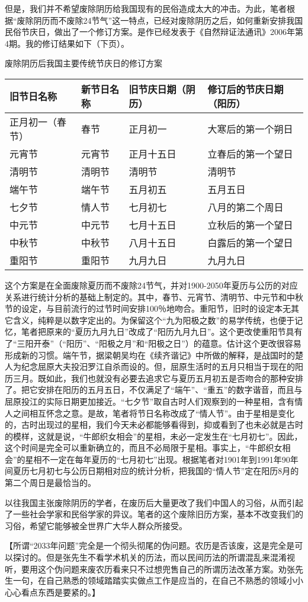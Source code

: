 但是，我们并不希望废除阴历给我国现有的民俗造成太大的冲击。为此，笔者根据“废除阴历而不废除24节气”这一特点，已经对废除阴历之后，如何重新安排我国民俗节庆日，做出了一个修订方案。是作已经发表于《自然辩证法通讯》2006年第4期。我的修订结果如下（下页）。
\begin{table}
\fangsong
\centerline{废除阴历后我国主要传统节庆日的修订方案}
\vspace{0.5em}
\begin{tabular}{llll}
\hline
旧节日名称 & 新节日名称 & 旧节庆日期（阴历） & 修订后的节庆日期（阳历） \\
\hline
正月初一（春节） & 春节 & 正月初一 & 大寒后的第一个朔日 \\
元宵节 & 元宵节 & 正月十五日 & 立春后的第一个望日 \\
清明节 & 清明节 & 清明节 & 清明节 \\
端午节 & 端午节 & 五月初五 & 五月五日 \\
七夕节 & 情人节 & 七月初七 & 八月的第二个周日 \\
中元节 & 中元节 & 七月十五日 & 立秋后的第一个望日 \\
中秋节 & 中秋节 & 八月十五日 & 白露后的第一个望日 \\
重阳节 & 重阳节 & 九月九日 & 九月九日\\
\hline
\end{tabular}
\end{table}
\normalsize

这个方案是在全面废除夏历而不废除24节气，并对1900-2050年夏历与公历的对应关系进行统计分析的基础上制定的。其中，春节、元宵节、清明节、中元节和中秋节的设定，与目前流行的过节时间安排100％地吻合。重阳节，旧时的设定本无其它含义，纯粹是以数字定出的。为保留这个“九为阳极之数”的易学传统，也便于记忆，笔者把原来的“夏历九月九日”改成了“阳历九月九日”。这个更改使重阳节具有了“三阳开泰”（“阳历”、“阳极之月”和“阳极之日”）的蕴意。估计这个更改很容易形成新的习惯。端午节，据梁朝吴均在《续齐谐记》中所做的解释，是战国时的楚人为纪念屈原大夫投汨罗江自杀而设的。但，屈原生活时的五月只相当于现在的阳历三月。既如此，我们也就没有必要去追求它与夏历五月初五是否吻合的那种安排了。把它安排在阳历的五月五日，不仅满足了“端午”、“重五”的数字谐音，而且与屈原投江的实际日期更加接近。“七夕节”取自古时人们观察到的一种星相，含有情人之间相互怀念之意。是故，笔者将节日名称改成了“情人节”。由于星相是变化的，古时出现过的星相，我们今天未必都能够看得到，抑或看到了也未必就是古时的模样，这就是说，“牛郎织女相会”的星相，未必一定发生在“七月初七”。因此，这个时间是完全可以重新确立的，而且不必局限于星相。事实上，“牛郎织女相会”的星相不一定在每年夏历的“七月初七”出现。根据笔者对1901年到1991年90年间夏历七月初七与公历日期相对应的统计分析，把我国的“情人节”定在阳历8月的第二个周日是最恰当的。

以往我国主张废除阴历的学者，在废历后大量更改了我们中国人的习俗，从而引起了一些社会学家和民俗学家的异议。笔者的这个废除旧历方案，基本不改变我们的习俗，希望它能够被全世界广大华人群众所接受。

\normalfont
【所谓“2033年问题”完全是一个彻头彻尾的伪问题。农历是否该废，这是完全是可以探讨的。但是张先生不看学术机关的历法，而以民间历法的所谓混乱来混淆视听，要用这个伪问题来废农历看来只不过想兜售自己的所谓历法改革方案。劝张先生一句，在自己熟悉的领域踏踏实实做点工作是应当的，在自己不熟悉的领域小小心心看点东西是要紧的。】